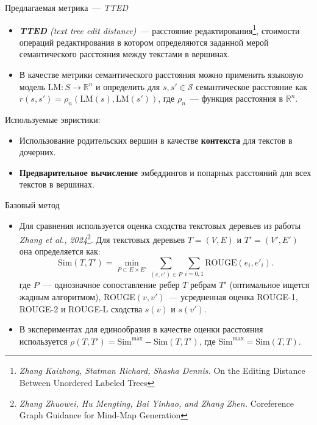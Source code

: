 \documentclass{beamer}
\newcommand{\R}{\mathbb{R}}
\begin{document}

\begin{frame}{Предлагаемая метрика~--- \textit{TTED}}

\begin{itemize}
    \item \textit{\textbf{TTED} (text tree edit distance)}~--- расстояние редактирования\footnote{\textit{Zhang Kaizhong, Statman Richard, Shasha Dennis.} On the Editing Distance Between Unordered Labeled Trees}, стоимости операций редактирования в котором определяются заданной мерой семантического расстояния между текстами в вершинах. 
    \item В качестве метрики семантического расстояния можно применить языковую модель $\text{LM}: S \rightarrow \R^n$ и определить для $s, s'\in\mathcal{S}$ семантическое расстояние как $r(s, s') = \rho_n(\text{LM}(s), \text{LM}(s'))$, где $\rho_n$~--- функция расстояния в $\R^n$.
\end{itemize}
\begin{block}{Используемые эвристики:}
    \begin{itemize}
        \item Использование родительских вершин в качестве \textbf{контекста} для текстов в дочерних.
        \item \textbf{Предварительное вычисление} эмбеддингов и попарных расстояний для всех текстов в вершинах.
    \end{itemize}    
\end{block}

\end{frame}


\begin{frame}{Базовый метод}

\begin{itemize}
\item Для сравнения используется оценка сходства текстовых деревьев из работы \textit{Zhang et al., 2024}\footnote{\textit{Zhang Zhuowei, Hu Mengting, Bai Yinhao, and Zhang Zhen.} Coreference Graph Guidance for Mind-Map Generation}. Для текстовых деревьев $T=(V, E)$ и $T'=(V',E')$ она определяется как:
$$
\text{Sim}(T, T') = \min\limits_{P\subset E\times E'} \sum\limits_{(e, e')\in P}\sum\limits_{i=0,1}\text{ROUGE}(e_i, e'_i).
$$
где $P$~--- однозначное сопоставление ребер $T$ ребрам $T'$ (оптимальное ищется жадным алгоритмом), ROUGE$(v, v')$~--- усредненная оценка ROUGE-1, ROUGE-2 и ROUGE-L сходства $s(v)$ и $s(v')$.
\item В экспериментах для единообразия в качестве оценки расстояния используется $\rho(T, T') = \text{Sim}^{\max} - \text{Sim}(T, T')$, где $\text{Sim}^{\max} = \text{Sim}(T, T)$.
\end{itemize}

\end{frame}
\end{document}
